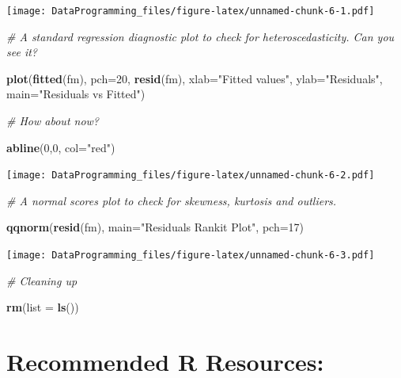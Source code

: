 \documentclass[]{book}
\newenvironment{Shaded}{\begin{snugshade}}{\end{snugshade}}
\newcommand{\CommentTok}[1]{\textcolor[rgb]{0.56,0.35,0.01}{\textit{#1}}}
\newcommand{\DataTypeTok}[1]{\textcolor[rgb]{0.13,0.29,0.53}{#1}}
\newcommand{\DecValTok}[1]{\textcolor[rgb]{0.00,0.00,0.81}{#1}}
\newcommand{\KeywordTok}[1]{\textcolor[rgb]{0.13,0.29,0.53}{\textbf{#1}}}
\newcommand{\NormalTok}[1]{#1}
\newcommand{\StringTok}[1]{\textcolor[rgb]{0.31,0.60,0.02}{#1}}
\begin{document}
\texttt{[image: DataProgramming\_files/figure-latex/unnamed-chunk-6-1.pdf]}

\begin{Shaded}
\begin{Highlighting}[]
\CommentTok{# A standard regression diagnostic plot to check for heteroscedasticity. Can you see it?}

\KeywordTok{plot}\NormalTok{(}\KeywordTok{fitted}\NormalTok{(fm), }\DataTypeTok{pch=}\DecValTok{20}\NormalTok{, }\KeywordTok{resid}\NormalTok{(fm), }\DataTypeTok{xlab=}\StringTok{"Fitted values"}\NormalTok{, }\DataTypeTok{ylab=}\StringTok{"Residuals"}\NormalTok{, }\DataTypeTok{main=}\StringTok{"Residuals vs Fitted"}\NormalTok{)}

\CommentTok{# How about now?}

\KeywordTok{abline}\NormalTok{(}\DecValTok{0}\NormalTok{,}\DecValTok{0}\NormalTok{, }\DataTypeTok{col=}\StringTok{"red"}\NormalTok{)  }
\end{Highlighting}
\end{Shaded}

\texttt{[image: DataProgramming\_files/figure-latex/unnamed-chunk-6-2.pdf]}

\begin{Shaded}
\begin{Highlighting}[]
\CommentTok{# A normal scores plot to check for skewness, kurtosis and outliers.}

\KeywordTok{qqnorm}\NormalTok{(}\KeywordTok{resid}\NormalTok{(fm), }\DataTypeTok{main=}\StringTok{"Residuals Rankit Plot"}\NormalTok{, }\DataTypeTok{pch=}\DecValTok{17}\NormalTok{)}
\end{Highlighting}
\end{Shaded}

\texttt{[image: DataProgramming\_files/figure-latex/unnamed-chunk-6-3.pdf]}

\begin{Shaded}
\begin{Highlighting}[]
\CommentTok{# Cleaning up}

\KeywordTok{rm}\NormalTok{(}\DataTypeTok{list =} \KeywordTok{ls}\NormalTok{())}
\end{Highlighting}
\end{Shaded}

\hypertarget{recommended-r-resources}{%
\section{Recommended R Resources:}\label{recommended-r-resources}}
\end{document}
